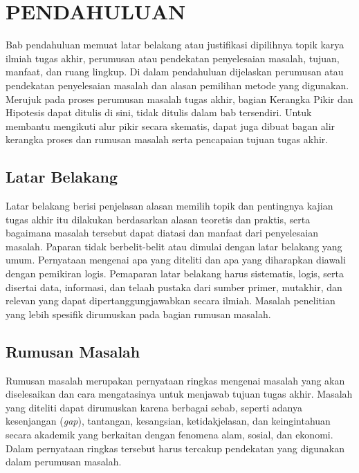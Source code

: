 
\chapter{PENDAHULUAN}

Bab pendahuluan memuat latar belakang atau justifikasi dipilihnya topik karya
ilmiah tugas akhir, perumusan atau pendekatan penyelesaian masalah, tujuan,
manfaat, dan ruang lingkup. Di dalam pendahuluan dijelaskan perumusan atau
pendekatan penyelesaian masalah dan alasan pemilihan metode yang digunakan.
Merujuk pada proses perumusan masalah tugas akhir, bagian Kerangka Pikir dan
Hipotesis dapat ditulis di sini, tidak ditulis dalam bab tersendiri. Untuk
membantu mengikuti alur pikir secara skematis, dapat juga dibuat bagan alir
kerangka proses dan rumusan masalah serta pencapaian tujuan tugas akhir.

\section{Latar Belakang}

Latar belakang berisi penjelasan alasan memilih topik dan pentingnya kajian
tugas akhir itu dilakukan berdasarkan alasan teoretis dan praktis, serta
bagaimana masalah tersebut dapat diatasi dan manfaat dari penyelesaian masalah.
Paparan tidak berbelit-belit atau dimulai dengan latar belakang yang umum.
Pernyataan mengenai apa yang diteliti dan apa yang diharapkan diawali dengan
pemikiran logis. Pemaparan latar belakang harus sistematis, logis, serta
disertai data, informasi, dan telaah pustaka dari sumber primer, mutakhir, dan
relevan yang dapat dipertanggungjawabkan secara ilmiah. Masalah penelitian
yang lebih spesifik dirumuskan pada bagian rumusan masalah.

\section{Rumusan Masalah}

Rumusan masalah merupakan pernyataan ringkas mengenai masalah yang akan
diselesaikan dan cara mengatasinya untuk menjawab tujuan tugas akhir. Masalah
yang diteliti dapat dirumuskan karena berbagai sebab, seperti adanya
kesenjangan (\textit{gap}), tantangan, kesangsian, ketidakjelasan, dan
keingintahuan secara akademik yang berkaitan dengan fenomena alam, sosial, dan
ekonomi. Dalam pernyataan ringkas tersebut harus tercakup pendekatan yang
digunakan dalam perumusan masalah.

